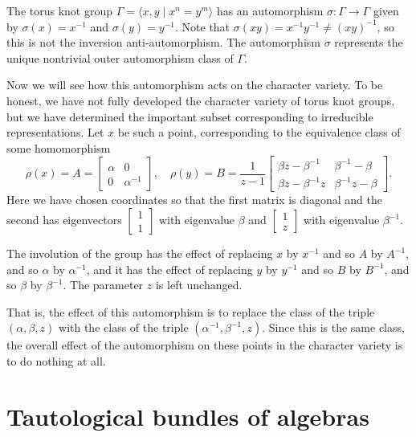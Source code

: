 \documentclass[11pt, oneside, usenames, dvipsnames, svgnames, table, draft]{amsart}
\begin{document}
\begin{example}
  The torus knot group $\Gamma = \langle x,y \mid x^n = y^m \rangle$ has an automorphism $\sigma: \Gamma \to \Gamma$ given
  by $\sigma(x) =x^{-1}$ and $\sigma(y) = y^{-1}$. Note that $\sigma(xy)= x^{-1}y^{-1} \neq (xy)^{-1}$, so this is not
  the inversion anti-automorphism. The automorphism $\sigma$ represents the unique nontrivial outer automorphism class of
  $\Gamma$.


  Now we will see how this automorphism acts on the character variety. To be honest, we have not fully developed the
  character variety of torus knot groups, but we have determined the important subset corresponding to irreducible
  representations. Let $x$ be such a point, corresponding to the equivalence class of some homomorphism
  \[  \rho(x) = A = \begin{bmatrix} \alpha & 0 \\ 0 & \alpha^{-1} \end{bmatrix}, \quad \rho(y) = B =
    \frac{1}{z-1}\begin{bmatrix} \beta z - \beta^{-1} & \beta^{-1} - \beta \\ \beta z - \beta^{-1} z & \beta^{-1} z -
      \beta \end{bmatrix}. \]
  Here we have chosen coordinates so that the first matrix is diagonal and the second has eigenvectors $\begin{bmatrix}
    1 \\ 1 \end{bmatrix}$ with eigenvalue $\beta$ and $\begin{bmatrix} 1 \\ z \end{bmatrix}$ with eigenvalue
  $\beta^{-1}$.

  The involution of the group has the effect of replacing $x$ by $x^{-1}$ and so $A$ by $A^{-1}$, and so $\alpha$ by
  $\alpha^{-1}$, and it has the effect of replacing $y$ by $y^{-1}$ and so $B$ by $B^{-1}$, and so $\beta$ by
  $\beta^{-1}$. The parameter $z$ is left unchanged.

  That is, the effect of this automorphism is to replace the class of the triple $(\alpha, \beta, z)$ with the class of
  the triple $(\alpha^{-1}, \beta^{-1}, z)$. Since this is the same class, the overall effect of the automorphism on
  these points in the character variety is to do nothing at all.  
\end{example}


\section{Tautological bundles of algebras}
\label{sec:taut-bundl-algebr}
\end{document}
